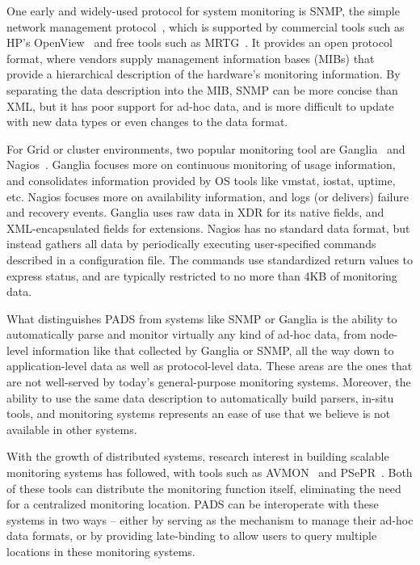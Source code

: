 
One early and widely-used protocol for system monitoring is SNMP, the
simple network management protocol~\cite{snmprfc1157}, which is
supported by commercial tools such as HP's OpenView~\cite{openview}
and free tools such as MRTG~\cite{mrtg}. It provides an open protocol
format, where vendors supply  management information bases (MIBs)
that provide a hierarchical description of the hardware's monitoring
information. By separating the data description into the MIB, SNMP
can be more concise than XML, but it has poor support for ad-hoc
data, and is more difficult to update with new data types or even
changes to the data format.

For Grid or cluster environments, two popular monitoring tool are
Ganglia~\cite{ganglia} and Nagios~\cite{nagios}.  Ganglia focuses more
on continuous monitoring of usage information, and consolidates
information provided by OS tools like vmstat, iostat, uptime,
etc. Nagios focuses more on availability information, and logs (or
delivers) failure and recovery events. Ganglia uses raw data in XDR
for its native fields, and XML-encapsulated fields for extensions.
Nagios has no standard data format, but instead gathers all data by
periodically executing user-specified commands described in a
configuration file. The commands use standardized return values to
express status, and are typically restricted to no more than 4KB of
monitoring data.

What distinguishes PADS from systems like SNMP or Ganglia is the
ability to automatically parse and monitor virtually any kind of
ad-hoc data, from node-level information like that collected by
Ganglia or SNMP, all the way down to application-level data as well as
protocol-level data. These areas are the ones that are not well-served
by today's general-purpose monitoring systems. Moreover, the ability
to use the same data description to automatically build parsers,
in-situ tools, and monitoring systems represents an ease of use that
we believe is not available in other systems.

With the growth of distributed systems, research interest in building
scalable monitoring systems has followed, with tools such as
AVMON~\cite{avmon} and PSePR~\cite{psepr}. Both of these tools can
distribute the monitoring function itself, eliminating the need for a
centralized monitoring location. PADS can be interoperate with these
systems in two ways -- either by serving as the mechanism to manage
their ad-hoc data formats, or by providing late-binding to allow users
to query multiple locations in these monitoring systems.

